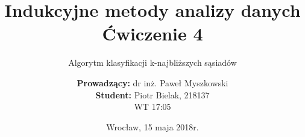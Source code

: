 \documentclass{scrartcl}
\title{Indukcyjne metody analizy danych\\Ćwiczenie 4}
\subtitle{Algorytm klasyfikacji k-najbliższych sąsiadów}
\author{\textbf{Prowadzący:} dr inż. Paweł Myszkowski \\ \textbf{Student:} Piotr Bielak, 218137\\WT 17:05}
\date{Wrocław, 15 maja 2018r.}
\begin{document}
\nocite{*}
\maketitle

\pagebreak
\tableofcontents

\pagebreak





\end{document}

